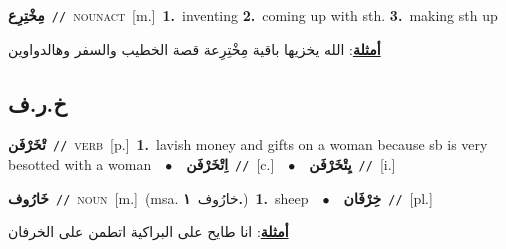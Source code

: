 \documentclass[10pt,a4paper,twoside]{article} %
\begin{document}
\begin{multicols}{2}
{\setlength\topsep{0pt}\textbf{\foreignlanguage{arabic}{مِخْتِرِع}}\ {\color{gray}\texttt{//}\color{black}}\ \textsc{noun\textunderscore act}\ [m.]\ \textbf{1.}~inventing  \textbf{2.}~coming up with sth.  \textbf{3.}~making sth up\  \begin{flushright}\color{gray}\foreignlanguage{arabic}{\textbf{\underline{\foreignlanguage{arabic}{أمثلة}}}: الله يخزيها باقية مِخْتِرِعة قصة الخطيب والسفر وهالدواوين}\end{flushright}\color{black}} \vspace{2mm}

\vspace{-3mm}
\subsection*{\color{blue}\foreignlanguage{arabic}{خ.ر.ف}\color{blue}{}} 

{\setlength\topsep{0pt}\textbf{\foreignlanguage{arabic}{تْخَرْفَن}}\ {\color{gray}\texttt{//}\color{black}}\ \textsc{verb}\ [p.]\ \textbf{1.}~lavish money and gifts on a woman because sb is very besotted with a woman\ \ $\bullet$\ \ \setlength\topsep{0pt}\textbf{\foreignlanguage{arabic}{اِتْخَرْفَن}}\ {\color{gray}\texttt{//}\color{black}}\ [c.]\ \ $\bullet$\ \ \setlength\topsep{0pt}\textbf{\foreignlanguage{arabic}{يِتْخَرْفَن}}\ {\color{gray}\texttt{//}\color{black}}\ [i.]\ } \vspace{2mm}

{\setlength\topsep{0pt}\textbf{\foreignlanguage{arabic}{خَارُوف}}\ {\color{gray}\texttt{//}\color{black}}\ \textsc{noun}\ [m.]\ \color{gray}(msa. \foreignlanguage{arabic}{خارُوف}~\foreignlanguage{arabic}{\textbf{١.}})\color{black}\ \textbf{1.}~sheep\ \ $\bullet$\ \ \setlength\topsep{0pt}\textbf{\foreignlanguage{arabic}{خِرْفَان}}\ {\color{gray}\texttt{//}\color{black}}\ [pl.]\  \begin{flushright}\color{gray}\foreignlanguage{arabic}{\textbf{\underline{\foreignlanguage{arabic}{أمثلة}}}: انا طايح على البراكية اتطمن على الخرفان}\end{flushright}\color{black}} \vspace{2mm}


\end{multicols}
\end{document}

